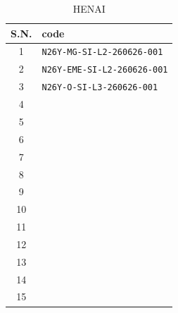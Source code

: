 \begin{table}[htbp]
    \centering
    \caption{HENAI}
    \begin{tabular}{cl}
    \hline
    S.N. & code\\
    \hline
    1 & \verb|N26Y-MG-SI-L2-260626-001|\\
    2 & \verb|N26Y-EME-SI-L2-260626-001|\\
    3 & \verb|N26Y-O-SI-L3-260626-001|\\
    4 & \verb||\\
    5 & \verb||\\
    6 & \verb||\\
    7 & \verb||\\
    8 & \verb||\\
    9 & \verb||\\
    10& \verb||\\
    11 & \verb||\\
    12 & \verb||\\
    13 & \verb||\\
    14 & \verb||\\
    15 & \verb||\\
    \hline
\end{tabular}
\end{table}

